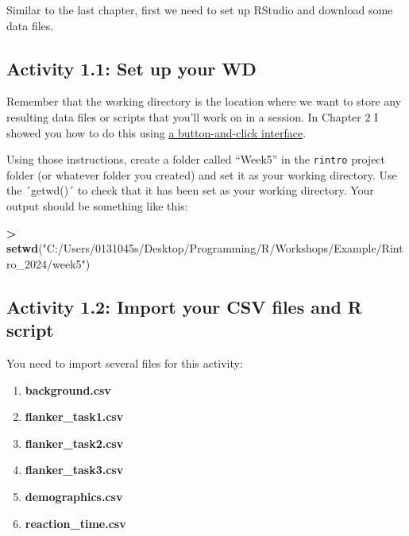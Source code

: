 \documentclass[
]{book}
\newenvironment{Shaded}{\begin{snugshade}}{\end{snugshade}}
\newcommand{\FunctionTok}[1]{\textcolor[rgb]{0.13,0.29,0.53}{\textbf{#1}}}
\newcommand{\NormalTok}[1]{#1}
\newcommand{\SpecialCharTok}[1]{\textcolor[rgb]{0.81,0.36,0.00}{\textbf{#1}}}
\newcommand{\StringTok}[1]{\textcolor[rgb]{0.31,0.60,0.02}{#1}}
\begin{document}
Similar to the last chapter, first we need to set up RStudio and download some data files.

\hypertarget{activity-1.1-set-up-your-wd-1}{%
\subsection{Activity 1.1: Set up your WD}\label{activity-1.1-set-up-your-wd-1}}

Remember that the working directory is the location where we want to store any resulting data files or scripts that you'll work on in a session. In Chapter 2 I showed you how to do this using \protect\hyperlink{set_wd}{a button-and-click interface}.

Using those instructions, create a folder called ``Week5'' in the \texttt{rintro} project folder (or whatever folder you created) and set it as your working directory. Use the ´getwd()´ to check that it has been set as your working directory. Your output should be something like this:

\begin{Shaded}
\begin{Highlighting}[]
\SpecialCharTok{\textgreater{}} \FunctionTok{setwd}\NormalTok{(}\StringTok{"C:/Users/0131045s/Desktop/Programming/R/Workshops/Example/Rintro\_2024/week5"}\NormalTok{)}
\end{Highlighting}
\end{Shaded}

\hypertarget{activity-1.2-import-your-csv-files-and-r-script-1}{%
\subsection{Activity 1.2: Import your CSV files and R script}\label{activity-1.2-import-your-csv-files-and-r-script-1}}

You need to import several files for this activity:

\begin{enumerate}
\def\labelenumi{\arabic{enumi}.}
\item
  \textbf{background.csv}
\item
  \textbf{flanker\_task1.csv}
\item
  \textbf{flanker\_task2.csv}
\item
  \textbf{flanker\_task3.csv}
\item
  \textbf{demographics.csv}
\item
  \textbf{reaction\_time.csv}
\end{enumerate}
\end{document}
